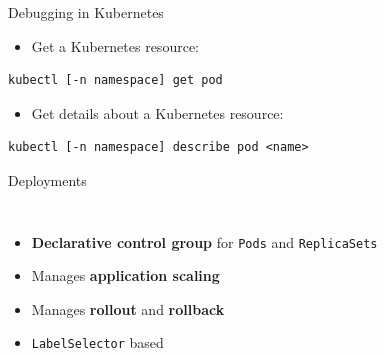 \begin{frame}[fragile]{Debugging in Kubernetes}
  \begin{itemize}\item Get a Kubernetes resource:\end{itemize}
  \begin{termbox}
\begin{lstlisting}[style=wstermstyle]
kubectl [-n namespace] get pod
\end{lstlisting}
  \end{termbox}
  \begin{itemize}\item Get details about a Kubernetes resource:\end{itemize}
  \begin{termbox}
\begin{lstlisting}[style=wstermstyle]
kubectl [-n namespace] describe pod <name>
\end{lstlisting}
  \end{termbox}
\end{frame}


\begin{frame}[fragile]{Deployments}
  \begin{columns}[c]
      \begin{itemize}
        \item {\color{wsorange}\textbf{Declarative control group}} for \texttt{Pods} and \texttt{ReplicaSets}
        \item Manages {\color{wsorange}\textbf{application scaling}}
        \item Manages {\color{wsorange}\textbf{rollout}} and {\color{wsorange}\textbf{rollback}}
        \item \texttt{LabelSelector} based
      \end{itemize}
  \end{columns}
\end{frame}

